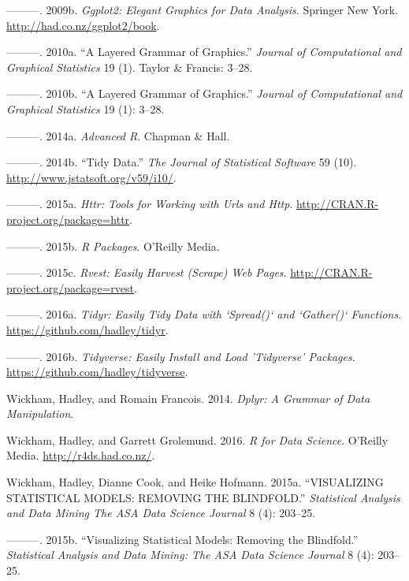 \documentclass[12pt,]{isuthesis}
\begin{document}
\hypertarget{ref-ggplot2-book}{}
---------. 2009b. \emph{Ggplot2: Elegant Graphics for Data Analysis}.
Springer New York. \url{http://had.co.nz/ggplot2/book}.

\hypertarget{ref-ggplot2-paper}{}
---------. 2010a. ``A Layered Grammar of Graphics.'' \emph{Journal of
Computational and Graphical Statistics} 19 (1). Taylor \& Francis:
3--28.

\hypertarget{ref-Wickham:2010hya}{}
---------. 2010b. ``A Layered Grammar of Graphics.'' \emph{Journal of
Computational and Graphical Statistics} 19 (1): 3--28.

\hypertarget{ref-adv-r}{}
---------. 2014a. \emph{Advanced R}. Chapman \& Hall.

\hypertarget{ref-tidy-data}{}
---------. 2014b. ``Tidy Data.'' \emph{The Journal of Statistical
Software} 59 (10). \url{http://www.jstatsoft.org/v59/i10/}.

\hypertarget{ref-httr}{}
---------. 2015a. \emph{Httr: Tools for Working with Urls and Http}.
\url{http://CRAN.R-project.org/package=httr}.

\hypertarget{ref-rpkgs}{}
---------. 2015b. \emph{R Packages}. O'Reilly Media.

\hypertarget{ref-rvest}{}
---------. 2015c. \emph{Rvest: Easily Harvest (Scrape) Web Pages}.
\url{http://CRAN.R-project.org/package=rvest}.

\hypertarget{ref-tidyr}{}
---------. 2016a. \emph{Tidyr: Easily Tidy Data with `Spread()` and
`Gather()` Functions}. \url{https://github.com/hadley/tidyr}.

\hypertarget{ref-tidyverse}{}
---------. 2016b. \emph{Tidyverse: Easily Install and Load 'Tidyverse'
Packages}. \url{https://github.com/hadley/tidyverse}.

\hypertarget{ref-dplyr}{}
Wickham, Hadley, and Romain Francois. 2014. \emph{Dplyr: A Grammar of
Data Manipulation}.

\hypertarget{ref-r4ds}{}
Wickham, Hadley, and Garrett Grolemund. 2016. \emph{R for Data Science}.
O'Reilly Media. \url{http://r4ds.had.co.nz/}.

\hypertarget{ref-Wickham:2015ur}{}
Wickham, Hadley, Dianne Cook, and Heike Hofmann. 2015a. ``VISUALIZING
STATISTICAL MODELS: REMOVING THE BLINDFOLD.'' \emph{Statistical Analysis
and Data Mining The ASA Data Science Journal} 8 (4): 203--25.

\hypertarget{ref-model-vis-paper}{}
---------. 2015b. ``Visualizing Statistical Models: Removing the
Blindfold.'' \emph{Statistical Analysis and Data Mining: The ASA Data
Science Journal} 8 (4): 203--25.
\end{document}
